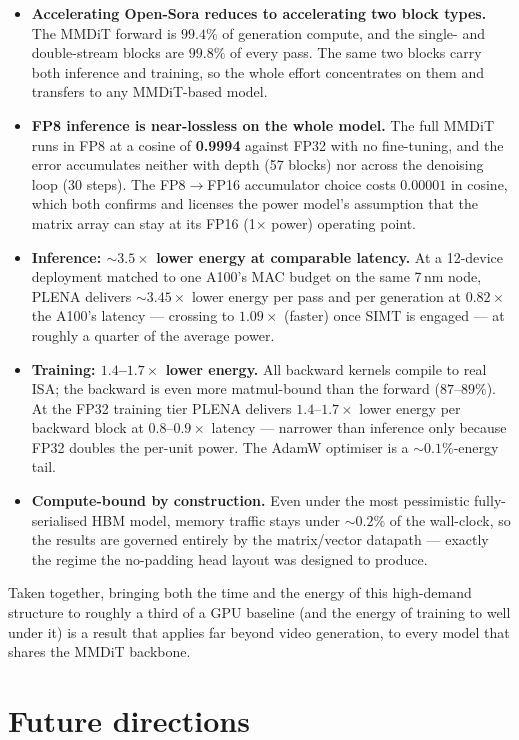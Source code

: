 \documentclass[11pt]{report}
\begin{document}
\begin{itemize}
\item \textbf{Accelerating Open-Sora reduces to accelerating two block
types.} The MMDiT forward is $99.4\%$ of generation compute, and the single-
and double-stream blocks are $99.8\%$ of every pass. The same two blocks
carry both inference and training, so the whole effort concentrates on them
and transfers to any MMDiT-based model.
\item \textbf{FP8 inference is near-lossless on the whole model.} The full
MMDiT runs in FP8 at a cosine of \textbf{0.9994} against FP32 with no
fine-tuning, and the error accumulates neither with depth (57 blocks) nor
across the denoising loop (30 steps). The FP8$\to$FP16 accumulator choice
costs $0.00001$ in cosine, which both confirms and licenses the power model's
assumption that the matrix array can stay at its FP16 (1$\times$ power)
operating point.
\item \textbf{Inference: ${\sim}3.5\times$ lower energy at comparable
latency.} At a 12-device deployment matched to one A100's MAC budget on the
same 7\,nm node, PLENA delivers ${\sim}3.45\times$ lower energy per pass and
per generation at $0.82\times$ the A100's latency --- crossing to
$1.09\times$ (faster) once SIMT is engaged --- at roughly a quarter of the
average power.
\item \textbf{Training: $1.4$--$1.7\times$ lower energy.} All backward
kernels compile to real ISA; the backward is even more matmul-bound than the
forward ($87$--$89\%$). At the FP32 training tier PLENA delivers
$1.4$--$1.7\times$ lower energy per backward block at $0.8$--$0.9\times$
latency --- narrower than inference only because FP32 doubles the per-unit
power. The AdamW optimiser is a ${\sim}0.1\%$-energy tail.
\item \textbf{Compute-bound by construction.} Even under the most
pessimistic fully-serialised HBM model, memory traffic stays under
${\sim}0.2\%$ of the wall-clock, so the results are governed entirely by the
matrix/vector datapath --- exactly the regime the no-padding head layout was
designed to produce.
\end{itemize}

Taken together, bringing both the time and the energy of this high-demand
structure to roughly a third of a GPU baseline (and the energy of training
to well under it) is a result that applies far beyond video generation, to
every model that shares the MMDiT backbone.

\section{Future directions}
\label{sec:future}
\end{document}
